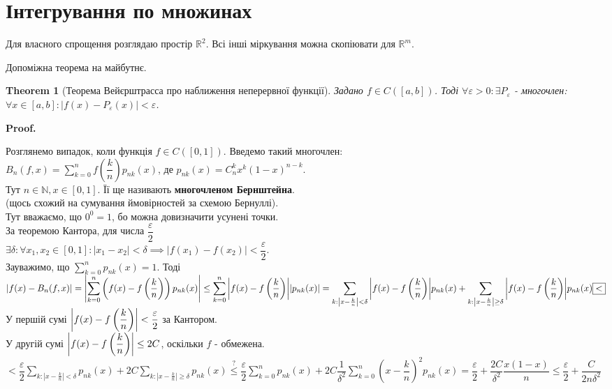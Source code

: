\documentclass[a4paper, 10pt]{article}
\makeatletter
\def\qed{$\blacksquare$}
\theoremstyle{theoremdd}
\newtheorem{theorem}{Theorem}[subsection]
\theoremstyle{theoremdd}
\theoremstyle{theoremdd}
\theoremstyle{theoremdd}
\theoremstyle{theoremdd}
\theoremstyle{theoremdd}
\theoremstyle{theoremdd}
\theoremstyle{theoremdd}
\renewenvironment{proof}[1][Proof.\\]{\par
\pushQED{\hfill \qed}%
\normalfont \topsep6\p@\@plus6\p@\relax
\trivlist
\item\relax
{\bfseries
#1\@addpunct{.}}\hspace\labelsep\ignorespaces
}{%
\popQED\endtrivlist\@endpefalse
}
\makeatother
\begin{document}
\newpage

\section{Інтегрування по множинах}
Для власного спрощення розглядаю простір $\mathbb{R}^2$. Всі інші міркування можна скопіювати для $\mathbb{R}^m$.

Допоміжна теорема на майбутнє.
\begin{theorem}[Теорема Вейєрштрасса про наближення неперервної функції]
Задано $f \in C([a,b])$. Тоді $\forall \varepsilon > 0: \exists P_\varepsilon$ - многочлен: $\forall x \in [a,b]: |f(x) - P_\varepsilon(x)| < \varepsilon$.
\end{theorem}

\begin{proof}
Розглянемо випадок, коли функція $f \in C([0,1])$. Введемо такий многочлен:\\
$B_n(f,x) = \displaystyle\sum_{k=0}^n f \left( \dfrac{k}{n} \right) p_{nk}(x)$, де $p_{nk}(x) = C_n^k x^k (1-x)^{n-k}$.\\
Тут $n \in \mathbb{N}, x \in [0,1]$. Її ще називають \textbf{многочленом Бернштейна}. \\
(щось схожий на сумування ймовірностей за схемою Бернуллі).\\
Тут вважаємо, що $0^0 = 1$, бо можна довизначити усунені точки.\\
За теоремою Кантора, для числа $\dfrac{\varepsilon}{2}$\\
$\exists \delta: \forall x_1,x_2 \in [0,1]: |x_1-x_2| < \delta \implies |f(x_1)-f(x_2)| < \dfrac{\varepsilon}{2}$.\\
Зауважимо, що $\displaystyle\sum_{k=0}^n p_{nk}(x) = 1$.
Тоді\\
$|f(x) - B_{n}(f,x)| = \displaystyle\abs{\sum_{k=0}^n \left( f(x) - f\left( \dfrac{k}{n} \right) \right) p_{nk}(x) } \leq \sum_{k=0}^n \abs{f(x) - f\left( \dfrac{k}{n} \right)} |p_{nk}(x)| \\
= \sum_{k: \left| x -\frac{k}{n} \right| < \delta} \abs{f(x) - f\left( \dfrac{k}{n} \right)} p_{nk}(x) + \sum_{k: \left| x -\frac{k}{n} \right| \geq \delta} \abs{f(x) - f\left( \dfrac{k}{n} \right)} p_{nk}(x) \boxed{<}$\\
У першій сумі $\abs{f(x) - f\left( \dfrac{k}{n} \right)} < \dfrac{\varepsilon}{2}$ за Кантором.\\
У другій сумі $\abs{f(x) - f\left( \dfrac{k}{n} \right)} \leq 2C$, оскільки $f$ - обмежена.\\
$\boxed{<} \displaystyle \dfrac{\varepsilon}{2} \sum_{k: \left| x -\frac{k}{n} \right| < \delta} p_{nk}(x) + 2C \sum_{k: \left| x -\frac{k}{n} \right| \geq \delta} p_{nk}(x) \overset{?}{\leq} \dfrac{\varepsilon}{2} \sum_{k=0}^n p_{nk}(x) + 2C \dfrac{1}{\delta^2} \sum_{k=0}^n \left( x -\dfrac{k}{n} \right)^2 p_{nk}(x) = \dfrac{\varepsilon}{2} + \dfrac{2C}{\delta^2} \dfrac{x(1-x)}{n} \leq \dfrac{\varepsilon}{2} + \dfrac{C}{2n\delta^2}$\\

\end{proof}
\end{document}
